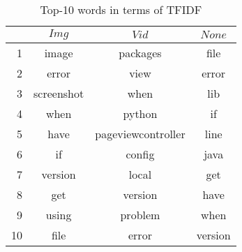 \begin{table}[t]
  \begin{center}
  \caption{Top-10 words in terms of TFIDF}
  \begin{tabular}{r | c c c}
    \hline
     & $Img$ & $Vid$ & $None$\\
    \hline
    \vspace{-0.3mm}
    1 & image & packages & file\\
    \vspace{-0.3mm}
    2 & error & view & error\\
    \vspace{-0.3mm}
    3 & screenshot & when & lib\\
    \vspace{-0.3mm}
    4 & when & python & if\\
    \vspace{-0.3mm}
    5 & have & pageviewcontroller & line\\
    \vspace{-0.3mm}
    6 & if & config & java \\
    \vspace{-0.3mm}
    7 & version & local & get\\
    \vspace{-0.3mm}
    8 & get & version & have\\
    \vspace{-0.3mm}
    9 & using & problem & when\\
    \vspace{-0.3mm}
    10& file & error & version\\
    \hline
  \end{tabular}\\
  \label{tab:tfidf-result}
  \end{center}
\end{table}
